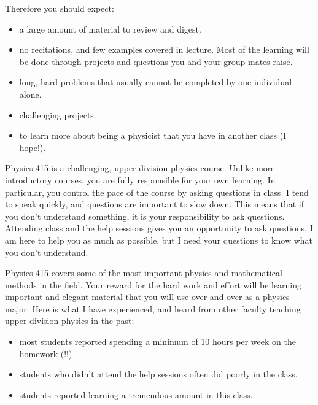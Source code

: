 \documentclass[letterpaper,10pt,english]{jupyterBook}
\begin{document}
\sphinxAtStartPar
Therefore you should expect:
\begin{itemize}
\item {} 
\sphinxAtStartPar
a large amount of material to review and digest.

\item {} 
\sphinxAtStartPar
no recitations, and few examples covered in lecture. Most of the learning will be done through projects and questions you and your group mates raise.

\item {} 
\sphinxAtStartPar
long, hard problems that usually cannot be completed by one individual alone.

\item {} 
\sphinxAtStartPar
challenging projects.

\item {} 
\sphinxAtStartPar
to learn more about being a physicist that you have in another class (I hope!).

\end{itemize}

\sphinxAtStartPar
Physics 415 is a challenging, upper‐division physics course. Unlike more introductory courses, you are fully responsible for your own learning. In particular, you control the pace of the course by asking questions in class. I tend to speak quickly, and questions are important to slow down. This means that if you don’t understand something, it is your responsibility to ask questions. Attending class and the help sessions gives you an opportunity to ask questions. I am here to help you as much as possible, but I need your questions to know what you don’t understand.

\sphinxAtStartPar
Physics 415 covers some of the most important physics and mathematical methods in the field. Your reward for the hard work and effort will be learning important and elegant material that you will use over and over as a physics major. Here is what I have experienced, and heard from
other faculty teaching upper division physics in the past:
\begin{itemize}
\item {} 
\sphinxAtStartPar
most students reported spending a minimum of 10 hours per week on the
homework (!!)

\item {} 
\sphinxAtStartPar
students who didn’t attend the help sessions
often did poorly in the class.

\item {} 
\sphinxAtStartPar
students reported learning a tremendous amount in this class.

\end{itemize}
\end{document}
